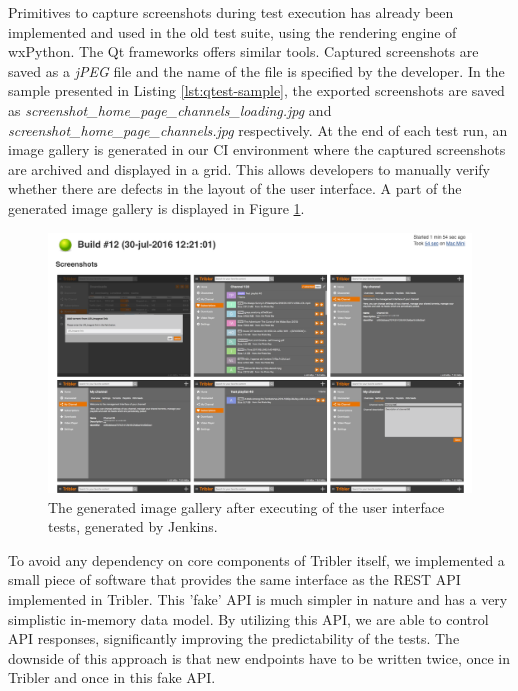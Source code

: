 Primitives to capture screenshots during test execution has already been implemented and used in the old test suite, using the rendering engine of wxPython. The Qt frameworks offers similar tools. Captured screenshots are saved as a \emph{jPEG} file and the name of the file is specified by the developer. In the sample presented in Listing \ref{lst:qtest-sample}, the exported screenshots are saved as \emph{screenshot\_home\_page\_channels\_loading.jpg} and \emph{screenshot\_home\_page\_channels.jpg} respectively. At the end of each test run, an image gallery is generated in our CI environment where the captured screenshots are archived and displayed in a grid. This allows developers to manually verify whether there are defects in the layout of the user interface. A part of the generated image gallery is displayed in Figure \ref{fig:jenkins-gallery}.\\

\begin{figure}[h!]
	\centering
	\includegraphics[width=1.0\columnwidth]{images/improving_qa/gallery_jenkins}
	\caption{The generated image gallery after executing of the user interface tests, generated by Jenkins.}
	\label{fig:jenkins-gallery}
\end{figure}

To avoid any dependency on core components of Tribler itself, we implemented a small piece of software that provides the same interface as the REST API implemented in Tribler. This 'fake' API is much simpler in nature and has a very simplistic in-memory data model. By utilizing this API, we are able to control API responses, significantly improving the predictability of the tests. The downside of this approach is that new endpoints have to be written twice, once in Tribler and once in this fake API.

